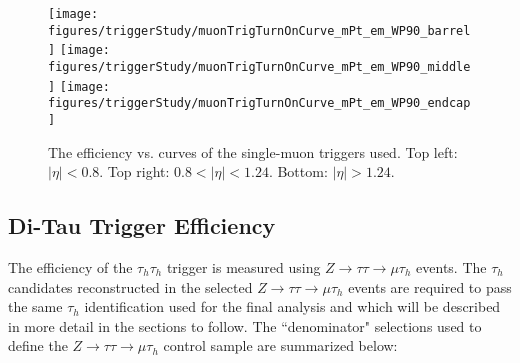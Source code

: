 \begin{figure}\centering
  \texttt{[image: figures/triggerStudy/muonTrigTurnOnCurve\_mPt\_em\_WP90\_barrel]}
  \texttt{[image: figures/triggerStudy/muonTrigTurnOnCurve\_mPt\_em\_WP90\_middle]}
  \texttt{[image: figures/triggerStudy/muonTrigTurnOnCurve\_mPt\_em\_WP90\_endcap]}
  \caption{\label{fig:muturnon} The efficiency vs. \pt curves of the
    single-muon triggers used. Top left: $|\eta|<0.8$.  Top right: $0.8<|\eta|<1.24$. Bottom: $|\eta|>1.24$.}
\end{figure}


\subsection{Di-Tau Trigger Efficiency}\label{sec:tauTrigger}

The efficiency of the $\tau_{h}\tau_{h}$ trigger is measured using 
$Z\to\tau\tau\to\mu\tau_{h}$ events.  The $\tau_{h}$ candidates 
reconstructed in the selected $Z\to\tau\tau\to\mu\tau_{h}$ events are 
required to pass the same $\tau_{h}$ identification used for the final
analysis and which will be described in more detail in the sections to follow. The 
``denominator" selections used to define the $Z\to\tau\tau\to\mu\tau_{h}$ control sample 
are summarized below:

